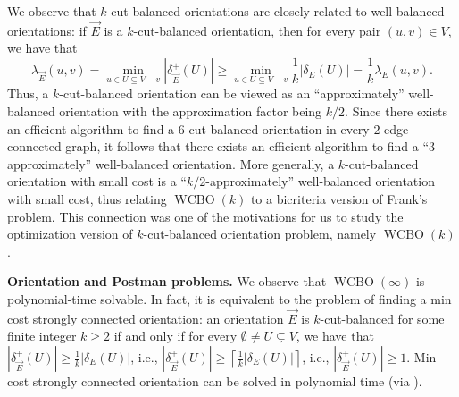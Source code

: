 \documentclass[11pt]{article}
\newcommand{\roundup}[1]{\left\lceil#1\right\rceil}
\begin{document}
We observe that $k$-cut-balanced orientations are closely related to well-balanced orientations: if $\vec{E}$ is a $k$-cut-balanced orientation, then for every pair $(u,v)\in V$, we have that 
\[\lambda_{\vec{E}}(u,v)=\min\limits_{u\in U\subseteq V-v}|\delta_{\vec{E}}^+(U)|\geq \min\limits_{u\in U\subseteq V-v}\frac{1}{k}|\delta_E(U)|=\frac{1}{k}\lambda_E(u,v).
\]
Thus, a $k$-cut-balanced orientation can be viewed as an ``approximately'' well-balanced orientation with the approximation factor being $k/2$. Since there exists an efficient algorithm to find a $6$-cut-balanced orientation in every $2$-edge-connected graph, it follows that there exists an efficient algorithm to find a ``$3$-approximately'' well-balanced orientation. More generally, a $k$-cut-balanced orientation with small cost  is a ``$k/2$-approximately'' well-balanced orientation with small cost, thus relating $\operatorname{WCBO}(k)$ to a bicriteria version of Frank's problem. This connection was one of the motivations for us to study the optimization version of $k$-cut-balanced orientation problem, namely $\operatorname{WCBO}(k)$.

\vspace{1mm}
\noindent \textbf{Orientation and Postman problems.}
We observe that $\operatorname{WCBO}(\infty)$ is polynomial-time solvable. In fact, it is equivalent to the problem of finding a min cost strongly connected orientation: 
an orientation $\vec{E}$ is $k$-cut-balanced for some finite integer $k\ge 2$ if and only if 
for every $\emptyset\neq U\subsetneq V$, we have that $|\delta_{\vec{E}}^+(U)|\geq \frac{1}{k}|\delta_{E}(U)|$, i.e., $|\delta_{\vec{E}}^+(U)|\geq \roundup{\frac{1}{k}|\delta_{E}(U)|}$, i.e., $|\delta_{\vec{E}}^+(U)|\geq 1$. Min cost strongly connected orientation can be solved in polynomial time (via \cite{lucchesi1978minimax, edmonds1977min}). 
\end{document}
